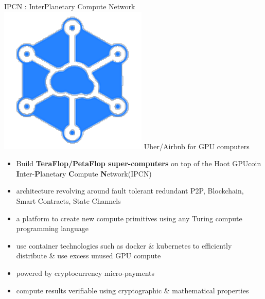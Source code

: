 \begin{frame}[t]{IPCN
	: InterPlanetary Compute Network}
	\includegraphics[scale=.3]{static/ipcn-p2p}
	 Uber/Airbnb for GPU computers
 \begin{itemize}
 \item Build \textbf{TeraFlop/PetaFlop super-computers} on top of the  Hoot GPUcoin \textbf{I}nter-\textbf{P}lanetary \textbf{C}ompute \textbf{N}etwork(IPCN)
 \item architecture revolving around fault tolerant redundant P2P, Blockchain, Smart Contracts, State Channels
 \item a platform to create new compute primitives using any Turing compute programming language
 \item use container technologies such as docker \& kubernetes to efficiently distribute \& use excess unused GPU compute
 \item powered by cryptocurrency micro-payments
 \item compute results verifiable using cryptographic \& mathematical properties
 \end{itemize}
\end{frame}
